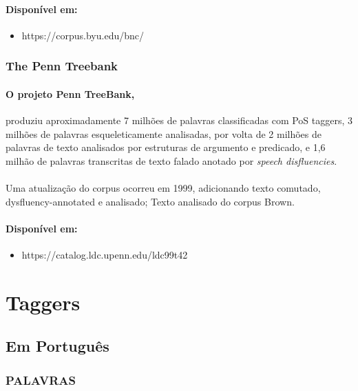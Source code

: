 \documentclass[a4paper, 10pt]{article}
\begin{document}
                \paragraph{Disponível em:}
                \begin{itemize}
                    \item https://corpus.byu.edu/bnc/
                \end{itemize}
           \subsubsection{The Penn Treebank} 
           		\paragraph{O projeto Penn TreeBank,} produziu aproximadamente 7 milhões de palavras classificadas com PoS taggers, 3 milhões de palavras esqueleticamente analisadas, por volta de 2 milhões de palavras de texto analisados por estruturas de argumento e predicado, e 1,6 milhão de palavras transcritas de texto falado anotado por \textit{speech disfluencies}. 
                \paragraph{}Uma atualização do corpus ocorreu em 1999, adicionando texto comutado, dysfluency-annotated e analisado; Texto analisado do corpus Brown.
                
                \paragraph{Disponível em:}
                \begin{itemize}
                    \item https://catalog.ldc.upenn.edu/ldc99t42
                \end{itemize}
    \section{Taggers}
    	\subsection{Em Português}
        	\subsubsection{PALAVRAS}
\end{document}
